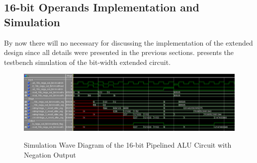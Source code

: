 \newpage

\subsection{16-bit Operands Implementation and Simulation}

By now there will no necessary for discussing the implementation of the extended design
since all details were presented in the previous sections.
 presents the testbench simulation of the bit-width extended circuit.


\begin{figure}[!ht]
	\centering
	\caption{Simulation Wave Diagram of the 16-bit Pipelined ALU Circuit with Negation Output}
	\includegraphics[width=\textwidth]{../img/p_16_sim.png}
	\label{fig:p_16_sim}
\end{figure}